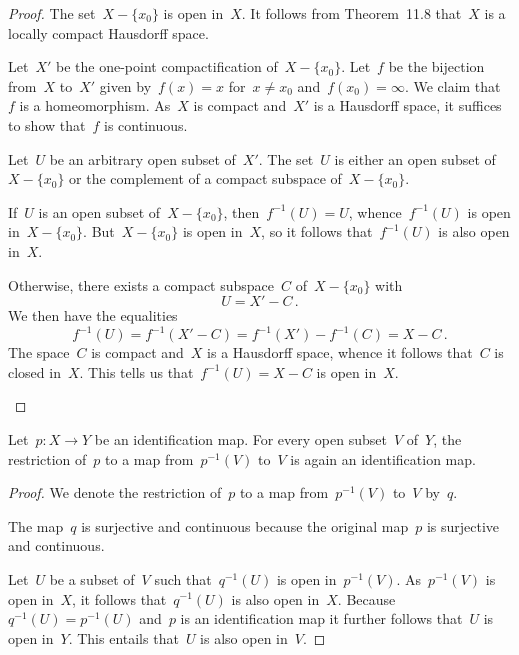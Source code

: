 \begin{proof}
	The set~$X - \{ x_0 \}$ is open in~$X$.
	It follows from Theorem~11.8 that~$X$ is a locally compact Hausdorff space.
	
	Let~$X'$ be the one-point compactification of~$X - \{ x_0 \}$.
	Let~$f$ be the bijection from~$X$ to~$X'$ given by~$f(x) = x$ for~$x ≠ x_0$ and~$f(x_0) = ∞$.
	We claim that~$f$ is a homeomorphism.
	As~$X$ is compact and~$X'$ is a Hausdorff space, it suffices to show that~$f$ is continuous.

	Let~$U$ be an arbitrary open subset of~$X'$.
	The set~$U$ is either an open subset of~$X - \{ x_0 \}$ or the complement of a compact subspace of~$X - \{ x_0 \}$.
	\begin{casedistinction}

		\item
			If~$U$ is an open subset of~$X - \{ x_0 \}$, then~$f^{-1}(U) = U$, whence~$f^{-1}(U)$ is open in~$X - \{ x_0 \}$.
			But~$X - \{ x_0 \}$ is open in~$X$, so it follows that~$f^{-1}(U)$ is also open in~$X$.

		\item
			Otherwise, there exists a compact subspace~$C$ of~$X - \{ x_0 \}$ with
			\[
				U = X' - C \,.
			\]
			We then have the equalities
			\[
				f^{-1}(U)
				=
				f^{-1}(X' - C)
				=
				f^{-1}(X') - f^{-1}(C)
				=
				X - C \,.
			\]
			The space~$C$ is compact and~$X$ is a Hausdorff space, whence it follows that~$C$ is closed in~$X$.
			This tells us that~$f^{-1}(U) = X - C$ is open in~$X$.
		\qedhere

	\end{casedistinction}
\end{proof}

\begin{lemma}
	\label{restriction of identification map}
	Let~$p \colon X \to Y$ be an identification map.
	For every open subset~$V$ of~$Y$, the restriction of~$p$ to a map from~$p^{-1}(V)$ to~$V$ is again an identification map.
\end{lemma}

\begin{proof}
	We denote the restriction of~$p$ to a map from~$p^{-1}(V)$ to~$V$ by~$q$.

	The map~$q$ is surjective and continuous because the original map~$p$ is surjective and continuous.

	Let~$U$ be a subset of~$V$ such that~$q^{-1}(U)$ is open in~$p^{-1}(V)$.
	As~$p^{-1}(V)$ is open in~$X$, it follows that~$q^{-1}(U)$ is also open in~$X$.
	Because~$q^{-1}(U) = p^{-1}(U)$ and~$p$ is an identification map it further follows that~$U$ is open in~$Y$.
	This entails that~$U$ is also open in~$V$.
\end{proof}

